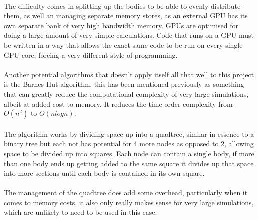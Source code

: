 \paragraph{}
The difficulty comes in splitting up the bodies to be able to evenly distribute them, as well an managing separate memory stores, as an external GPU has its own separate bank of very high bandwidth memory. GPUs are optimised for doing a large amount of very simple calculations. Code that runs on a GPU must be written in a way that allows the exact same code to be run on every single GPU core, forcing a very different style of programming.

\paragraph{}
Another potential algorithms that doesn't apply itself all that well to this project is the Barnes Hut algorithm, this has been mentioned previously as something that can greatly reduce the computational complexity of very large simulations, albeit at added cost to memory. It reduces the time order complexity from $O(n^2)$ to $O(nlogn)$.

\paragraph{}
The algorithm works by dividing space up into a quadtree, similar in essence to a binary tree but each not has potential for 4 more nodes as opposed to 2, allowing space to be divided up into squares. Each node can contain a single body, if more than one body ends up getting added to the same square it divides up that space into more sections until each body is contained in its own square.

\paragraph{}
The management of the quadtree does add some overhead, particularly when it comes to memory costs, it also only really makes sense for very large simulations, which are unlikely to need to be used in this case.